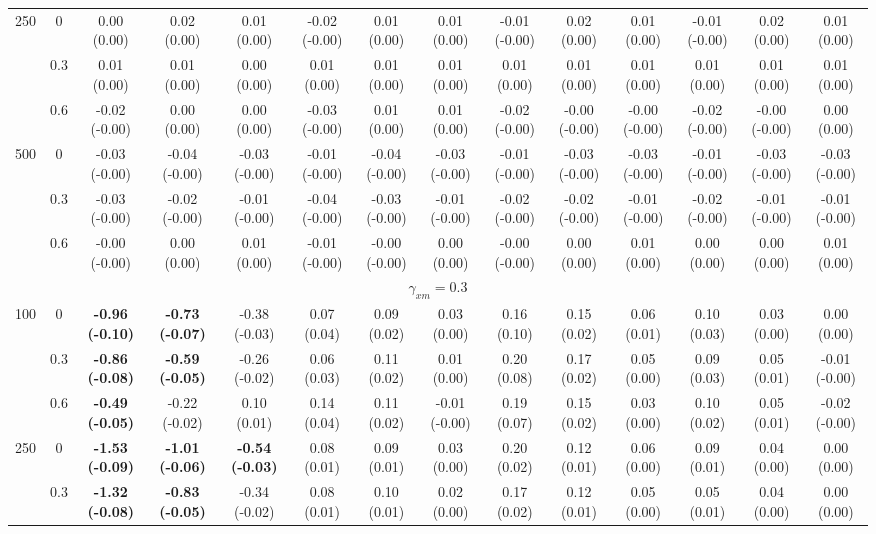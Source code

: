 \documentclass[
  man]{apa6}
\newenvironment{lltable}{\begin{landscape}\centering\begin{ThreePartTable}}{\end{ThreePartTable}\end{landscape}}
\begin{document}
\begin{lltable}
{\begin{longtable}{cccccccccccccc}
250 & 0 & 0.00 (0.00) & 0.02 (0.00) & 0.01 (0.00) & -0.02 (-0.00) & 0.01 (0.00) & 0.01 (0.00) & -0.01 (-0.00) & 0.02 (0.00) & 0.01 (0.00) & -0.01 (-0.00) & 0.02 (0.00) & 0.01 (0.00)\\
 & 0.3 & 0.01 (0.00) & 0.01 (0.00) & 0.00 (0.00) & 0.01 (0.00) & 0.01 (0.00) & 0.01 (0.00) & 0.01 (0.00) & 0.01 (0.00) & 0.01 (0.00) & 0.01 (0.00) & 0.01 (0.00) & 0.01 (0.00)\\
 & 0.6 & -0.02 (-0.00) & 0.00 (0.00) & 0.00 (0.00) & -0.03 (-0.00) & 0.01 (0.00) & 0.01 (0.00) & -0.02 (-0.00) & -0.00 (-0.00) & -0.00 (-0.00) & -0.02 (-0.00) & -0.00 (-0.00) & 0.00 (0.00)\\
500 & 0 & -0.03 (-0.00) & -0.04 (-0.00) & -0.03 (-0.00) & -0.01 (-0.00) & -0.04 (-0.00) & -0.03 (-0.00) & -0.01 (-0.00) & -0.03 (-0.00) & -0.03 (-0.00) & -0.01 (-0.00) & -0.03 (-0.00) & -0.03 (-0.00)\\
 & 0.3 & -0.03 (-0.00) & -0.02 (-0.00) & -0.01 (-0.00) & -0.04 (-0.00) & -0.03 (-0.00) & -0.01 (-0.00) & -0.02 (-0.00) & -0.02 (-0.00) & -0.01 (-0.00) & -0.02 (-0.00) & -0.01 (-0.00) & -0.01 (-0.00)\\
 & 0.6 & -0.00 (-0.00) & 0.00 (0.00) & 0.01 (0.00) & -0.01 (-0.00) & -0.00 (-0.00) & 0.00 (0.00) & -0.00 (-0.00) & 0.00 (0.00) & 0.01 (0.00) & 0.00 (0.00) & 0.00 (0.00) & 0.01 (0.00)\\
\multicolumn{14}{c}{$\gamma_{xm} = 0.3$}\\
100 & 0 & \textbf{-0.96 (-0.10)} & \textbf{-0.73 (-0.07)} & -0.38 (-0.03) & 0.07 (0.04) & 0.09 (0.02) & 0.03 (0.00) & 0.16 (0.10) & 0.15 (0.02) & 0.06 (0.01) & 0.10 (0.03) & 0.03 (0.00) & 0.00 (0.00)\\
 & 0.3 & \textbf{-0.86 (-0.08)} & \textbf{-0.59 (-0.05)} & -0.26 (-0.02) & 0.06 (0.03) & 0.11 (0.02) & 0.01 (0.00) & 0.20 (0.08) & 0.17 (0.02) & 0.05 (0.00) & 0.09 (0.03) & 0.05 (0.01) & -0.01 (-0.00)\\
 & 0.6 & \textbf{-0.49 (-0.05)} & -0.22 (-0.02) & 0.10 (0.01) & 0.14 (0.04) & 0.11 (0.02) & -0.01 (-0.00) & 0.19 (0.07) & 0.15 (0.02) & 0.03 (0.00) & 0.10 (0.02) & 0.05 (0.01) & -0.02 (-0.00)\\
250 & 0 & \textbf{-1.53 (-0.09)} & \textbf{-1.01 (-0.06)} & \textbf{-0.54 (-0.03)} & 0.08 (0.01) & 0.09 (0.01) & 0.03 (0.00) & 0.20 (0.02) & 0.12 (0.01) & 0.06 (0.00) & 0.09 (0.01) & 0.04 (0.00) & 0.00 (0.00)\\
 & 0.3 & \textbf{-1.32 (-0.08)} & \textbf{-0.83 (-0.05)} & -0.34 (-0.02) & 0.08 (0.01) & 0.10 (0.01) & 0.02 (0.00) & 0.17 (0.02) & 0.12 (0.01) & 0.05 (0.00) & 0.05 (0.01) & 0.04 (0.00) & 0.00 (0.00)\\

\end{longtable}}
\end{lltable}
\end{document}
